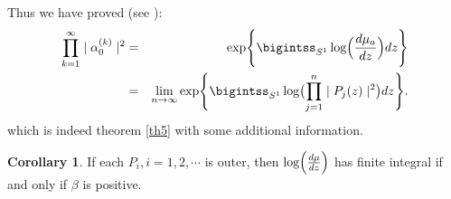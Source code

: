\documentclass{amsart}
\theoremstyle{definition}
\newtheorem{Cor}[Th]{Corollary}
\theoremstyle{remark}
\numberwithin{equation}{section}
\newcommand{\1}{\mathbb{1}}
\begin{document}
\noindent{}Thus we have proved (see \cite{Nadkarni2}):
 \begin{eqnarray*}
\prod_{k=1}^\infty\mid\alpha_0^{(k)}\mid^2 &=& \exp \Biggl\{\bigintss_{S^1}\log \Bigr(\frac{d\mu_a}{dz}\Bigl)dz\Biggr\}\\
&=&\lim_{n\rightarrow \infty}\exp\Biggl\{\bigintss_{S^1}\log \bigl(\prod_{j=1}^n \mid P_j(z)\mid^2 \bigr)dz\Biggr\}.
\end{eqnarray*}
which is indeed theorem \ref{th5} with some additional information.\\

\begin{Cor}
If each $P_i, i=1,2,\cdots$ is outer, then $\log \Bigl(\frac{d\mu}{dz}\Bigl)$ has finite integral if and only if $\beta$ is positive.
\end{Cor}
\end{document}
